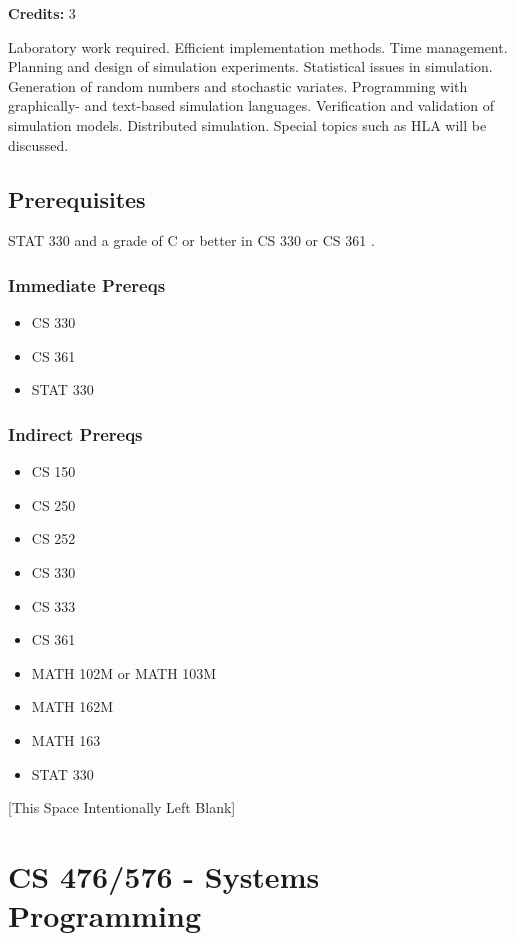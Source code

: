 \documentclass[]{article}
\providecommand{\tightlist}{%
  \setlength{\itemsep}{0pt}\setlength{\parskip}{0pt}}
\newcommand{\pagebreakhere}{
\vspace*{\fill}
\begin{center}
[This Space Intentionally Left Blank]
\end{center}
\vspace*{\fill}
\newpage
}
\begin{document}
\textbf{Credits:} 3

Laboratory work required. Efficient implementation methods. Time
management. Planning and design of simulation experiments. Statistical
issues in simulation. Generation of random numbers and stochastic
variates. Programming with graphically- and text-based simulation
languages. Verification and validation of simulation models. Distributed
simulation. Special topics such as HLA will be discussed.

\subsection{Prerequisites}\label{prerequisites-45}

STAT 330 and a grade of C or better in CS 330 or CS 361 .

\subsubsection{Immediate Prereqs}\label{immediate-prereqs-36}

\begin{itemize}
\tightlist
\item
  CS 330
\item
  CS 361
\item
  STAT 330
\end{itemize}

\subsubsection{Indirect Prereqs}\label{indirect-prereqs-36}

\begin{itemize}
\tightlist
\item
  CS 150
\item
  CS 250
\item
  CS 252
\item
  CS 330
\item
  CS 333
\item
  CS 361
\item
  MATH 102M or MATH 103M
\item
  MATH 162M
\item
  MATH 163
\item
  STAT 330
\end{itemize}

\pagebreakhere
\section{CS 476/576 - Systems
Programming}\label{cs-476576---systems-programming}
\end{document}
